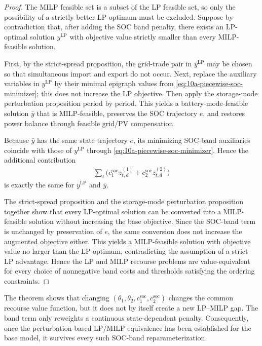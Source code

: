 \begin{proof}
The MILP feasible set is a subset of the LP feasible set, so only the possibility of a strictly better LP optimum must be excluded. Suppose by contradiction that, after adding the SOC band penalty, there exists an LP-optimal solution \(y^{\mathrm{LP}}\) with objective value strictly smaller than every MILP-feasible solution.

First, by the strict-spread proposition, the grid-trade pair in \(y^{\mathrm{LP}}\) may be chosen so that simultaneous import and export do not occur. Next, replace the auxiliary variables in \(y^{\mathrm{LP}}\) by their minimal epigraph values from \eqref{eq:10a-piecewise-soc-minimizer}; this does not increase the LP objective. Then apply the storage-mode perturbation proposition period by period. This yields a battery-mode-feasible solution \(\bar y\) that is MILP-feasible, preserves the SOC trajectory \(e\), and restores power balance through feasible grid/PV compensation.

Because \(\bar y\) has the same state trajectory \(e\), its minimizing SOC-band auxiliaries coincide with those of \(y^{\mathrm{LP}}\) through \eqref{eq:10a-piecewise-soc-minimizer}. Hence the additional contribution
\begin{align}
\sum_t \big(c^{\mathrm{soc}}_1 z^{(1)}_{t,d} + c^{\mathrm{soc}}_2 z^{(2)}_{t,d}\big)
\end{align}
is exactly the same for \(y^{\mathrm{LP}}\) and \(\bar y\).

The strict-spread proposition and the storage-mode perturbation proposition together show that every LP-optimal solution can be converted into a MILP-feasible solution without increasing the base objective. Since the SOC-band term is unchanged by preservation of \(e\), the same conversion does not increase the augmented objective either. This yields a MILP-feasible solution with objective value no larger than the LP optimum, contradicting the assumption of a strict LP advantage. Hence the LP and MILP recourse problems are value-equivalent for every choice of nonnegative band costs and thresholds satisfying the ordering constraints.
\end{proof}

\begin{remark}
The theorem shows that changing \((\theta_1,\theta_2,c^{\mathrm{soc}}_1,c^{\mathrm{soc}}_2)\) changes the common recourse value function, but it does not by itself create a new LP--MILP gap. The band term only reweights a continuous state-dependent penalty. Consequently, once the perturbation-based LP/MILP equivalence has been established for the base model, it survives every such SOC-band reparameterization.
\end{remark}

